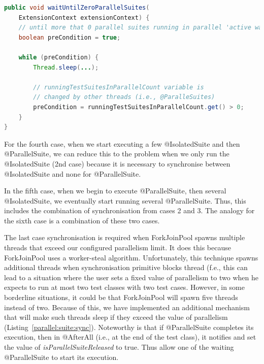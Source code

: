 \begin{lstlisting}[language=Java,label=parallelsuite:isolatedsuite:sync,caption=@ParallelSuite and @IsolatedSuite synchronisation mechanism,frame=tb]
public void waitUntilZeroParallelSuites(
    ExtensionContext extensionContext) {
    // until more that 0 parallel suites running in parallel 'active waiting'
    boolean preCondition = true;

    while (preCondition) {
        Thread.sleep(...);

        // runningTestSuitesInParallelCount variable is
        // changed by other threads (i.e., @ParalleSuites)
        preCondition = runningTestSuitesInParallelCount.get() > 0;
    }
}
\end{lstlisting}

For the fourth case, when we start executing a few @IsolatedSuite and then @ParallelSuite, we can reduce this to the
problem when we only run the @IsolatedSuite (2nd case) because it is necessary to synchronise between @IsolatedSuite
and none for @ParallelSuite.

In the fifth case, when we begin to execute @ParallelSuite, then several @IsolatedSuite, we eventually start running several
@ParallelSuite. Thus, this includes the combination of synchronisation from cases 2 and 3.
The analogy for the sixth case is a combination of these two cases.

The last case synchronisation is required when ForkJoinPool spawns multiple threads that exceed our configured parallelism limit.
It does this because ForkJoinPool uses a worker-steal algorithm. Unfortunately, this technique spawns additional threads when
synchronisation primitive blocks thread (f.e., this can lead to a situation where the user sets a fixed value of parallelism
to two when he expects to run at most two test classes with two test cases. However, in some borderline situations,
it could be that ForkJoinPool will spawn five threads instead of two. Because of this, we have implemented an additional
mechanism that will make such threads sleep if they exceed the value of parallelism (Listing~\ref{parallel:suite:sync}).
Noteworthy is that if @ParallelSuite completes its execution, then in @AfterAll (i.e., at the end of the test class),
it notifies and set the value of \emph{isParallelSuiteReleased} to true. Thus allow one of the waiting @ParallelSuite to start its execution.

